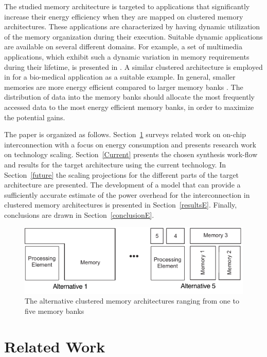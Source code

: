    The studied memory architecture is targeted to applications that significantly increase their energy efficiency when they are mapped on clustered memory architectures.
  These applications are characterized by having dynamic utilization of the memory organization during their execution. 
 Suitable dynamic applications are available on several different domains.
 For example, a set of multimedia applications, which exhibit such a dynamic variation in memory requirements during their lifetime, is presented in \cite{filippopoulos2013exploration}.
 A similar clustered architecture is employed in \cite{Fil12} for a bio-medical application as a suitable example.
 In general, smaller memories are more energy efficient compared to larger memory banks \cite{steinke2002assigning}. 
 The distribution of data into the memory banks should allocate the most frequently accessed data to the most energy efficient memory banks, in order to maximize the potential gains.
 
The paper is organized as follows.
Section~\ref{relatedE} surveys related work on on-chip interconnection with a focus on energy consumption and presents research work on technology scaling. 
Section~\ref{Current} presents the chosen synthesis work-flow and results for the target architecture using the current technology.
In Section~\ref{future} the scaling projections for the different parts of the target architecture are presented.
The development of a model that can provide a sufficiently accurate estimate of the power overhead for the interconnection in clustered memory architectures is presented in Section~\ref{resultsE}.
Finally, conclusions are drawn in Section~\ref{conclusionE}.

\begin{figure}
 \centering
 \includegraphics[width = \textwidth]{E/platform.pdf}
  \caption{The alternative clustered memory architectures ranging from one to five memory banks}
 \label{fig:platformE}
 \end{figure}

\section{Related Work}
\label{relatedE}

